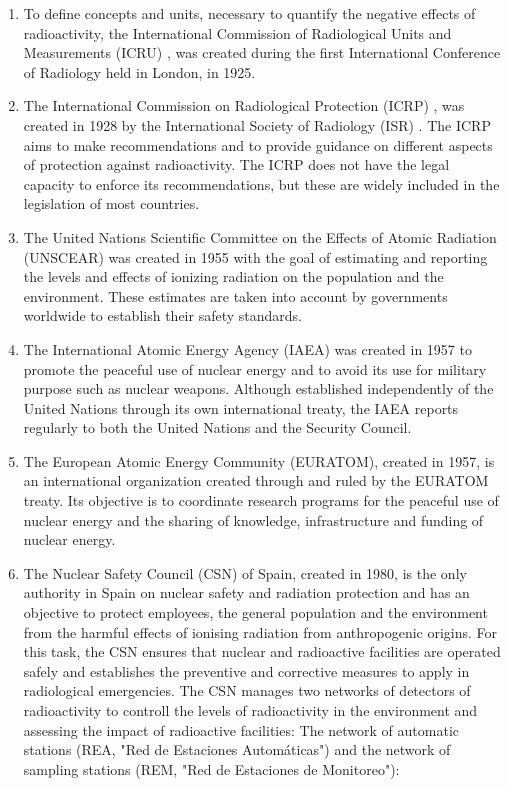 \begin{enumerate}
\item{} To define concepts and units, necessary to quantify the negative effects of radioactivity, the International Commission of Radiological Units and Measurements (ICRU) \cite{ICRU}, was created during the first International Conference of Radiology held in London, in 1925.

\item{} The International Commission on Radiological Protection (ICRP) \cite{ICRP}, was created in 1928 by the International Society of Radiology (ISR) \cite{ISR}. The ICRP aims to make recommendations and to provide guidance on different aspects of protection against radioactivity. The ICRP does not have the legal capacity to enforce its recommendations, but these are widely included in the legislation of most countries. %

\item{} The United Nations Scientific Committee on the Effects of Atomic Radiation (UNSCEAR) \cite{UNSCEAR} was created in 1955 with the goal of estimating and reporting the levels and effects of ionizing radiation on the population and the environment. These estimates are taken into account by governments worldwide to establish their safety standards.

\item{} The International Atomic Energy Agency (IAEA) \cite{IAEA} was created in 1957 to promote the peaceful use of nuclear energy and to avoid its use for military purpose such as nuclear weapons. Although established independently of the United Nations \cite{UN} through its own international treaty, the IAEA reports regularly to both the United Nations and the Security Council.

\item{} The European Atomic Energy Community (EURATOM), created in 1957, is an international organization created through and ruled by the EURATOM treaty. Its objective is to coordinate research programs for the peaceful use of nuclear energy and the sharing of knowledge, infrastructure and funding of nuclear energy.

\item{} The Nuclear Safety Council (CSN) \cite{CSN} of Spain, created in 1980, is the only authority in Spain on nuclear safety and radiation protection and has an objective to protect employees, the general population and the environment from the harmful effects of ionising radiation from anthropogenic origins. For this task, the CSN ensures that nuclear and radioactive facilities are operated safely and establishes the preventive and corrective measures to apply in radiological emergencies. The CSN manages two networks of detectors of radioactivity to controll the levels of radioactivity in the environment and assessing the impact of radioactive facilities: The network of automatic stations (REA, "Red de Estaciones Automáticas") and the network of sampling stations (REM, "Red de Estaciones de Monitoreo"):


\end{enumerate}
